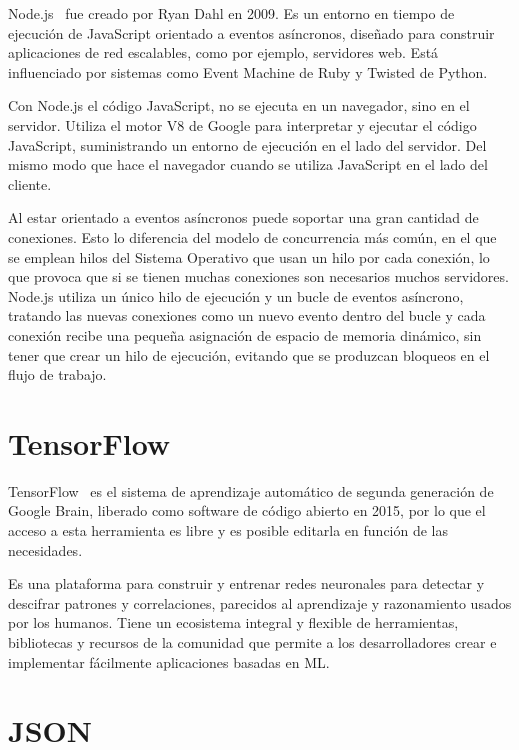 \documentclass[a4paper, 12pt]{book}
\begin{document}
Node.js~\cite{Pagina_de_Node} fue creado por Ryan Dahl en 2009. Es un entorno en tiempo de ejecución de JavaScript orientado a eventos asíncronos, diseñado para construir aplicaciones de red escalables, como por ejemplo, servidores web. 
Está influenciado por sistemas como Event Machine de Ruby y Twisted de Python.

Con Node.js el código JavaScript, no se ejecuta en un navegador, sino en el servidor. Utiliza el motor V8 de Google para interpretar y ejecutar el código JavaScript, suministrando un entorno de ejecución en el lado del servidor. 
Del mismo modo que hace el navegador cuando se utiliza JavaScript en el lado del cliente.

Al estar orientado a eventos asíncronos puede soportar una gran cantidad de conexiones. 
Esto lo diferencia del modelo de concurrencia más común, en el que se emplean hilos del Sistema Operativo que usan un hilo por cada conexión, lo que provoca que si se tienen muchas conexiones son necesarios muchos servidores. 
Node.js utiliza un único hilo de ejecución y un bucle de eventos asíncrono, tratando las nuevas conexiones como un nuevo evento dentro del bucle y cada conexión recibe una pequeña asignación de espacio de memoria dinámico, sin tener que crear un hilo de ejecución, evitando que se produzcan bloqueos en el flujo de trabajo. 

\section{TensorFlow} 
\label{sec:TensorFlow}

TensorFlow~\cite{Pagina_de_TensorFlow} es el sistema de aprendizaje automático de segunda generación de Google Brain, liberado como software de código abierto en 2015, por lo que el acceso a esta herramienta es libre y es posible editarla en función de las necesidades. 

Es una plataforma para construir y entrenar redes neuronales para detectar y descifrar patrones y correlaciones, parecidos al aprendizaje y razonamiento usados por los humanos. 
Tiene un ecosistema integral y flexible de herramientas, bibliotecas y recursos de la comunidad que permite a los desarrolladores crear e implementar fácilmente aplicaciones basadas en ML.


\section{JSON} 
\label{sec:JSON}
\end{document}
